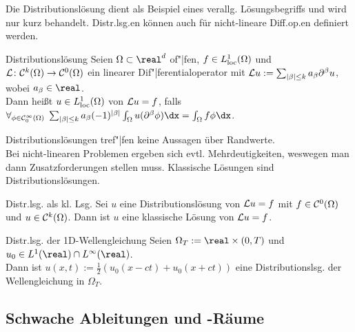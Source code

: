 \linie

\begin{Bem}
    Die Distributionslösung dient als Beispiel eines verallg. Lösungsbegriffs
    und wird nur kurz behandelt.
    Distr.lsg.en können auch für nicht-lineare Diff.op.en definiert werden.
\end{Bem}

\begin{Def}{Distributionslösung}
    Seien $\Omega \subset \real^d$ of"|fen, $f \in L^1_{\text{loc}}(\Omega)$ und
    $\mathcal{L}\colon \mathcal{C}^k(\Omega) \to \mathcal{C}^0(\Omega)$ ein linearer Dif"|ferentialoperator
    mit $\mathcal{L} u := \sum_{|\beta| \le k} a_{\beta} \partial^\beta u$, wobei $a_\beta \in \real$.\\
    Dann heißt $u \in L^1_{\text{loc}}(\Omega)$  von $\mathcal{L} u = f$, falls\\
    $\forall_{\phi \in \C^\infty_0(\Omega)}\;
    \sum_{|\beta| \le k} a_\beta (-1)^{|\beta|} \int_\Omega u (\partial^\beta \phi) \dx =
    \int_\Omega f\phi \dx$.
\end{Def}

\begin{Bem}
    Distributionslösungen tref"|fen keine Aussagen über Randwerte.\\
    Bei nicht-linearen Problemen ergeben sich evtl. Mehrdeutigkeiten, weswegen man dann
    Zusatzforderungen stellen muss.
    Klassische Lösungen sind Distributionslösungen.
\end{Bem}

\begin{Satz}{Distr.lsg. als kl. Lsg.}
    Sei $u$ eine Distributionslösung von $\mathcal{L} u = f$ mit $f \in \mathcal{C}^0(\Omega)$ und
    $u \in \mathcal{C}^k(\Omega)$.
    Dann ist $u$ eine klassische Lösung von $\mathcal{L} u = f$.
\end{Satz}

\begin{Satz}{Distr.lsg. der 1D-Wellengleichung}
   Seien $\Omega_T := \real \times (0, T)$ und $u_0 \in L^1(\real) \cap L^\infty(\real)$.\\
   Dann ist $u(x, t) := \frac{1}{2} (u_0(x - ct) + u_0(x + ct))$ eine
   Distributionslsg. der Wellengleichung in $\Omega_T$.
\end{Satz}

\pagebreak

\subsection{%
    Schwache Ableitungen und -Räume%
}

